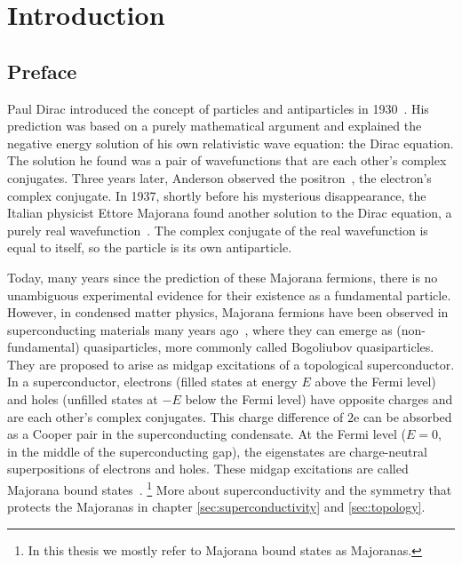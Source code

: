 \chapter{Introduction}
\label{ch:introduction}

\section{Preface}
Paul Dirac introduced the concept of particles and antiparticles in 1930~\cite{Dirac1930}.
His prediction was based on a purely mathematical argument and explained the negative energy solution of his own relativistic wave equation: the Dirac equation.
The solution he found was a pair of wavefunctions that are each other's complex conjugates.
Three years later, Anderson observed the positron~\cite{Anderson1933}, the electron's complex conjugate.
In 1937, shortly before his mysterious disappearance, the Italian physicist Ettore Majorana found another solution to the Dirac equation, a purely real wavefunction~\cite{Majorana1937}.
The complex conjugate of the real wavefunction is equal to itself, so the particle is its own antiparticle.

Today, many years since the prediction of these Majorana fermions, there is no unambiguous experimental evidence for their existence as a fundamental particle.
However, in condensed matter physics, Majorana fermions have been observed in superconducting materials many years ago~\cite{Kopnin1991}, where they can emerge as (non-fundamental) quasiparticles, more commonly called Bogoliubov quasiparticles.
They are proposed to arise as midgap excitations of a topological superconductor.
In a superconductor, electrons (filled states at energy $E$ above the Fermi level) and holes (unfilled states at $-E$ below the Fermi level) have opposite charges and are each other's complex conjugates.
This charge difference of $2\textrm{e}$ can be absorbed as a Cooper pair in the superconducting condensate.
At the Fermi level ($E=0$, in the middle of the superconducting gap), the eigenstates are charge-neutral superpositions of electrons and holes.
These midgap excitations are called Majorana bound states~\cite{Beenakker2013}.
\footnote{In this thesis we mostly refer to Majorana bound states as Majoranas.}
More about superconductivity and the symmetry that protects the Majoranas in chapter \ref{sec:superconductivity} and \ref{sec:topology}.

